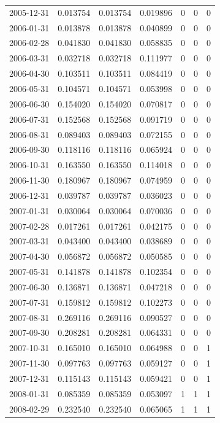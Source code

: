 \documentclass[conference,onecolumn]{IEEEtran}
\begin{document}
\begin{longtable}{|c|c|c|c|c|c|c|}
2005-12-31 & 0.013754 & 0.013754 & 0.019896 & 0 & 0 & 0 \\
2006-01-31 & 0.013878 & 0.013878 & 0.040899 & 0 & 0 & 0 \\
2006-02-28 & 0.041830 & 0.041830 & 0.058835 & 0 & 0 & 0 \\
2006-03-31 & 0.032718 & 0.032718 & 0.111977 & 0 & 0 & 0 \\
2006-04-30 & 0.103511 & 0.103511 & 0.084419 & 0 & 0 & 0 \\
2006-05-31 & 0.104571 & 0.104571 & 0.053998 & 0 & 0 & 0 \\
2006-06-30 & 0.154020 & 0.154020 & 0.070817 & 0 & 0 & 0 \\
2006-07-31 & 0.152568 & 0.152568 & 0.091719 & 0 & 0 & 0 \\
2006-08-31 & 0.089403 & 0.089403 & 0.072155 & 0 & 0 & 0 \\
2006-09-30 & 0.118116 & 0.118116 & 0.065924 & 0 & 0 & 0 \\
2006-10-31 & 0.163550 & 0.163550 & 0.114018 & 0 & 0 & 0 \\
2006-11-30 & 0.180967 & 0.180967 & 0.074959 & 0 & 0 & 0 \\
2006-12-31 & 0.039787 & 0.039787 & 0.036023 & 0 & 0 & 0 \\
2007-01-31 & 0.030064 & 0.030064 & 0.070036 & 0 & 0 & 0 \\
2007-02-28 & 0.017261 & 0.017261 & 0.042175 & 0 & 0 & 0 \\
2007-03-31 & 0.043400 & 0.043400 & 0.038689 & 0 & 0 & 0 \\
2007-04-30 & 0.056872 & 0.056872 & 0.050585 & 0 & 0 & 0 \\
2007-05-31 & 0.141878 & 0.141878 & 0.102354 & 0 & 0 & 0 \\
2007-06-30 & 0.136871 & 0.136871 & 0.047218 & 0 & 0 & 0 \\
2007-07-31 & 0.159812 & 0.159812 & 0.102273 & 0 & 0 & 0 \\
2007-08-31 & 0.269116 & 0.269116 & 0.090527 & 0 & 0 & 0 \\
2007-09-30 & 0.208281 & 0.208281 & 0.064331 & 0 & 0 & 0 \\
2007-10-31 & 0.165010 & 0.165010 & 0.064988 & 0 & 0 & 1 \\
2007-11-30 & 0.097763 & 0.097763 & 0.059127 & 0 & 0 & 1 \\
2007-12-31 & 0.115143 & 0.115143 & 0.059421 & 0 & 0 & 1 \\
2008-01-31 & 0.085359 & 0.085359 & 0.053097 & 1 & 1 & 1 \\
2008-02-29 & 0.232540 & 0.232540 & 0.065065 & 1 & 1 & 1 \\

\end{longtable}
\end{document}
